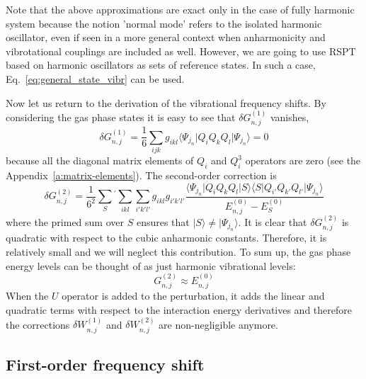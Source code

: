 \documentclass[a4paper,titlepage,twoside,fleqn,12pt]{book}
\begin{document}
\begin{refsection}
Note that the above approximations are exact only in the case of 
fully harmonic system because the notion 'normal mode' refers to
the isolated harmonic oscillator, even if seen in a more general context
when anharmonicity and vibrotational couplings are included as well.
However, we are going to use RSPT based on harmonic oscillators as 
sets of reference states. In such a case, Eq.~\eqref{eq:general_state_vibr} 
can be used.

Now let us return to the derivation of the vibrational frequency shifts. 
By considering the gas phase states it is easy to see that 
$\delta G_{n,j}^{(1)}$ vanishes,
%
\begin{equation}
\delta G_{n,j}^{(1)} = \frac{1}{6}\sum_{ijk} g_{ikl} 
\langle \Psi_{j_n} \vert Q_iQ_kQ_l \vert \Psi_{j_n} \rangle = 0
\end{equation}
%
because all the diagonal matrix elements of $Q_i$ and $Q_i^3$ operators
are zero (see the Appendix~\ref{a:matrix-elements}).
The second-order correction is 
%
\begin{equation}
\delta G_{n,j}^{(2)} = \frac{1}{6^2} \sum_{S}{^{'}} \sum_{ikl}\sum_{i'k'l'} g_{ikl} g_{i'k'l'}
\frac{\langle \Psi_{j_n} \vert Q_iQ_kQ_l \vert S \rangle \langle S \vert Q_{i'}Q_{k'}Q_{l'} \vert \Psi_{j_n} \rangle }
{ E_{n,j}^{(0)} - E_{S}^{(0)} }
\end{equation}
%
where the primed sum over $S$ ensures that $\vert S \rangle \ne \vert \Psi_{j_n} \rangle$. 
It is clear that $\delta G_{n,j}^{(2)}$ is quadratic with respect to the cubic anharmonic constants.
Therefore, it is relatively small and we will neglect this contribution.
To sum up, the gas phase energy levels can be thought of as just 
harmonic vibrational levels:
%
\begin{equation}\label{e:ge}
G_{n,j}^{(2)} \approx E_{n,j}^{(0)}
\end{equation}
%
When the $U$ operator is added to the perturbation, it adds the linear
and quadratic terms with respect to the interaction energy derivatives and therefore
the corrections $\delta W_{n,j}^{(1)}$ and $\delta W_{n,j}^{(2)}$ 
are non\hyp{}negligible anymore.

\subsection{First-order frequency shift}


\end{refsection}
\end{document}
